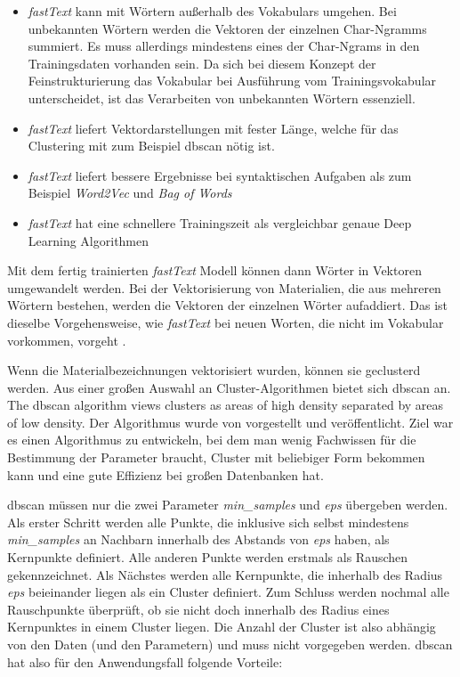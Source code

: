 \begin{itemize}
	\item \textit{fastText} kann mit Wörtern außerhalb des Vokabulars umgehen. Bei unbekannten Wörtern werden die Vektoren der einzelnen Char-Ngramms summiert. Es muss allerdings mindestens eines der Char-Ngrams in den Trainingsdaten vorhanden sein. \citep[vgl.][]{gensim_fastText,le2014distributed} Da sich bei diesem Konzept der Feinstrukturierung das Vokabular bei Ausführung vom Trainingsvokabular unterscheidet, ist das Verarbeiten von unbekannten Wörtern essenziell.
	\item \textit{fastText} liefert Vektordarstellungen mit fester Länge, welche für das Clustering mit zum Beispiel \ac{dbscan} nötig ist. \citep[vgl.][]{le2014distributed}
	\item \textit{fastText} liefert bessere Ergebnisse bei syntaktischen Aufgaben als zum Beispiel \textit{Word2Vec} und \textit{Bag of Words} \citep[vgl.][]{fastText_word2vec_comparison,le2014distributed}
	\item \textit{fastText} hat eine schnellere Trainingszeit als vergleichbar genaue Deep Learning Algorithmen \citep[vgl.][]{fastText_release2016}
\end{itemize}


Mit dem fertig trainierten \textit{fastText} Modell können dann Wörter in Vektoren umgewandelt werden. Bei der Vektorisierung von Materialien, die aus mehreren Wörtern bestehen, werden die Vektoren der einzelnen Wörter aufaddiert. Das ist dieselbe Vorgehensweise, wie \textit{fastText} bei neuen Worten, die nicht im Vokabular vorkommen, vorgeht \citep[vgl.][]{gensim_fastText}.

Wenn die Materialbezeichnungen vektorisiert wurden, können sie geclusterd werden. Aus einer großen Auswahl an Cluster-Algorithmen bietet sich \ac{dbscan} an. \glqq The \ac{dbscan} algorithm views clusters as areas of high density separated by areas of low density.\grqq{} \citep{scikitlearn_clustering} Der Algorithmus wurde \citeyear{Ester1996ADA} von \citeauthor{Ester1996ADA} vorgestellt und veröffentlicht. Ziel war es einen Algorithmus zu entwickeln, bei dem man wenig Fachwissen für die Bestimmung der Parameter braucht, Cluster mit beliebiger Form bekommen kann und eine gute Effizienz bei großen Datenbanken hat.

\ac{dbscan} müssen nur die zwei Parameter \textit{min\_samples} und \textit{eps} übergeben werden. Als erster Schritt werden alle Punkte, die inklusive sich selbst mindestens \textit{min\_samples} an Nachbarn innerhalb des Abstands von \textit{eps} haben, als Kernpunkte definiert. Alle anderen Punkte werden erstmals als Rauschen gekennzeichnet. Als Nächstes werden alle Kernpunkte, die inherhalb des Radius \textit{eps} beieinander liegen als ein Cluster definiert. Zum Schluss werden nochmal alle Rauschpunkte überprüft, ob sie nicht doch innerhalb des Radius eines Kernpunktes in einem Cluster liegen. \citep[vgl.][]{scikitlearn_clustering,Ester1996ADA} Die Anzahl der Cluster ist also abhängig von den Daten (und den Parametern) und muss nicht vorgegeben werden.
\ac{dbscan} hat also für den Anwendungsfall folgende Vorteile:

